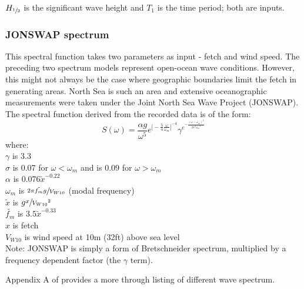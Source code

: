 $H_{\sfrac{1}{3}}$ is the significant wave height and $T_1$ is the time period;
both are inputs.

\subsubsection{JONSWAP spectrum} \label{JONSWAP spectrum}
This spectral function takes two parameters as input - fetch and wind speed. The 
preceding two spectrum models represent open-ocean wave conditions. However, 
this might not always be the case where geographic boundaries limit the fetch in
generating areas. North Sea is such an area and extensive oceanographic
measurements were taken under the Joint North Sea Wave Project (JONSWAP). The
spectral function derived from the recorded data is of the form: 
\begin{equation}
  S(\omega) = \frac{\alpha g}{\omega^{5}} 
  e^{
    {
    \big[ 
      -\frac{5}{4} \frac{\omega}{\omega_m} 
    \big]
    }^{-4}
  }
  \gamma^{
    e^{
        -\frac{(\omega -\omega_m)^2}{2 \sigma^2 {\omega_m}^2}
      }
    }
  \label {eq: JONSWAP spectrum}
\end{equation}
where:\\
$\gamma$ is 3.3\\
$\sigma$ is 0.07 for $\omega < \omega_m$ and is 0.09 for $\omega > \omega_m$\\
$\alpha$ is $0.076 {\tilde{x}}^{-0.22}$\\
$\omega_m $ is $ \sfrac{2 \pi \tilde{f_m} g}{V_{W10}}$ (modal frequency)\\
$\tilde{x}$ is $g \sfrac{x}{{V_{W10}}^2}$\\
$\tilde{f_m}$ is $3.5 {\tilde{x}}^{-0.33}$ \\
$x$ is fetch \\
$V_{W10}$ is wind speed at 10m (32ft) above sea level\\

Note: JONSWAP is simply a form of Bretschneider spectrum, multiplied by a
frequency dependent factor (the $\gamma$ term).

Appendix A of \cite{stansberg2002specialist} provides a more through listing of
different wave spectrum.

